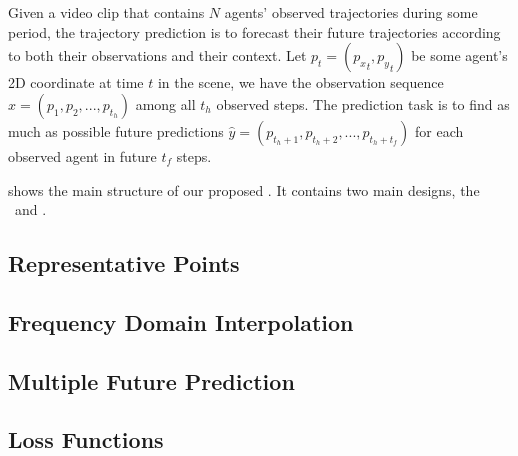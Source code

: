 \documentclass[../paper.tex]{subfiles}
\begin{document}
    
\section{\MODEL}

Given a video clip that contains $N$ agents' observed trajectories during some period, the trajectory prediction is to forecast their future trajectories according to both their observations and their context.
Let $p_t = ({p_x}_t, {p_y}_t)$ be some agent's 2D coordinate at time $t$ in the scene, we have the observation sequence $x = (p_1, p_2, ..., p_{t_h})$ among all $t_h$ observed steps.
The prediction task is to find as much as possible future predictions $\hat{y} = (p_{t_h + 1}, p_{t_h + 2}, ..., p_{t_h + t_f})$ for each observed agent in future $t_f$ steps.


 shows the main structure of our proposed \MODEL.
It contains two main designs, the \ALPHAMODEL~and \BETAMODEL.

\subsection{Representative Points}

\subsection{Frequency Domain Interpolation}

\subsection{Multiple Future Prediction}

\subsection{Loss Functions}
\end{document}
